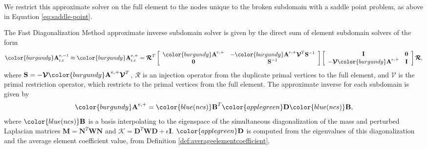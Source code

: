 We restrict this approximate solver on the full element to the nodes unique to the broken subdomain with a saddle point problem, as above in Equation \ref{eq:saddle-point}.

\begin{definition}
The Fast Diagonalization Method approximate inverse subdomain solver is given by the direct sum of element subdomain solvers of the form
\begin{equation}
{\color{burgundy}\mathbf{A}}^{e, -1}_{\text{r}, \text{r}} \approx {\color{burgundy}\mathbf{A}}^{e, +}_{\text{r}, \text{r}} = \boldsymbol{\mathcal{R}}^T
\left[ \begin{array}{c c}
{\color{burgundy}\mathbf{A}}^{e, +}  &  -{\color{burgundy}\mathbf{A}}^{e, +} \boldsymbol{\mathcal{V}}^T \mathbf{S}^{-1}  \\
\mathbf{0}                           &  \mathbf{S}^{-1}                                                     \\
\end{array} \right]
\left[ \begin{array}{c c}
\mathbf{I}                                                      &  \mathbf{0}  \\
- \boldsymbol{\mathcal{V}} {\color{burgundy}\mathbf{A}}^{e, +}  &  \mathbf{I}  \\
\end{array} \right]
\boldsymbol{\mathcal{R}},
\end{equation}
where $\mathbf{S} = - \boldsymbol{\mathcal{V}} {\color{burgundy}\mathbf{A}}^{e, +} \boldsymbol{\mathcal{V}}^T$, $\boldsymbol{\mathcal{R}}$ is an injection operator from the duplicate primal vertices to the full element, and $\boldsymbol{\mathcal{V}}$ is the primal restriction operator, which restricts to the primal vertices from the full element.
The approximate inverse for each subdomain is given by
\begin{equation}
{\color{burgundy}\mathbf{A}}^{e, +} = {\color{blue(ncs)}\mathbf{B}}^T {\color{applegreen}\mathbf{D}} {\color{blue(ncs)}\mathbf{B}},
\end{equation}
where ${\color{blue(ncs)}\mathbf{B}}$ is a basis interpolating to the eigenspace of the simultaneous diagonalization of the mass and perturbed Laplacian matrices $\mathbf{M} = \mathbf{N}^T \mathbf{W} \mathbf{N}$ and $\boldsymbol{\mathcal{K}} = \mathbf{D}^T \mathbf{W} \mathbf{D} + \epsilon \mathbf{I}$.
${\color{applegreen}\mathbf{D}}$ is computed from the eigenvalues of this diagonalization and the average element coefficient value, from Definition \ref{def:averageelementcoefficient},

\end{definition}

